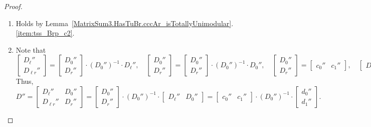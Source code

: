 \begin{proof}
    \leanok
    \begin{enumerate}
        \item Holds by Lemma~\ref{MatrixSum3.HasTuBr.cccAr_isTotallyUnimodular}.\ref{item:tss_Brp_c2}.

        \item Note that
        \[
            \begin{bmatrix} D_{\ell}'' \\ D_{\ell r}'' \end{bmatrix} = \begin{bmatrix} D_{0}'' \\ D_{r}'' \end{bmatrix} \cdot (D_{0}'')^{-1} \cdot D_{\ell}'', \quad
            \begin{bmatrix} D_{0}'' \\ D_{r}'' \end{bmatrix} = \begin{bmatrix} D_{0}'' \\ D_{r}'' \end{bmatrix} \cdot (D_{0}'')^{-1} \cdot D_{0}'', \quad
            \begin{bmatrix} D_{0}'' \\ D_{r}'' \end{bmatrix} = \begin{bmatrix} c_{0}'' & c_{1}'' \end{bmatrix}, \quad
            \begin{bmatrix} D_{\ell}'' & D_{0}'' \end{bmatrix} = \begin{bmatrix} d_{0}'' \\ d_{1}'' \end{bmatrix}.
        \]
        Thus,
        \[
            D''
            = \begin{bmatrix} D_{\ell}'' & D_{0}'' \\ D_{\ell r}'' & D_{r}'' \end{bmatrix}
            = \begin{bmatrix} D_{0}'' \\ D_{r}'' \end{bmatrix} \cdot (D_{0}'')^{-1} \cdot \begin{bmatrix} D_{\ell}'' & D_{0}'' \end{bmatrix}
            = \begin{bmatrix} c_{0}'' & c_{1}'' \end{bmatrix} \cdot (D_{0}'')^{-1} \cdot \begin{bmatrix} d_{0}'' \\ d_{1}'' \end{bmatrix}.
\]
\end{enumerate}
\end{proof}
